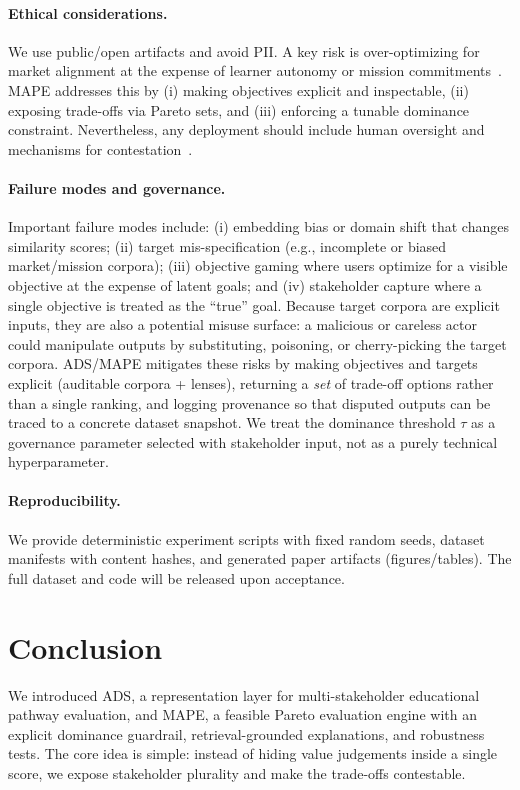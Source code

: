 \documentclass[sigconf,review]{acmart}
\newcommand{\ADS}{\textsc{ADS}\xspace}
\newcommand{\MAPE}{\textsc{MAPE}\xspace}
\begin{document}
\paragraph{Ethical considerations.}
We use public/open artifacts and avoid PII. A key risk is over-optimizing for market alignment at the expense of learner autonomy or mission commitments~\cite{ekstrand2019fairness}. \MAPE addresses this by (i) making objectives explicit and inspectable, (ii) exposing trade-offs via Pareto sets, and (iii) enforcing a tunable dominance constraint. Nevertheless, any deployment should include human oversight and mechanisms for contestation~\cite{alfrink2023contestable,dignum2025contesting}.

\paragraph{Failure modes and governance.}
Important failure modes include: (i) {embedding bias} or domain shift that changes similarity scores; (ii) {target mis-specification} (e.g., incomplete or biased market/mission corpora); (iii) {objective gaming} where users optimize for a visible objective at the expense of latent goals; and (iv) {stakeholder capture} where a single objective is treated as the ``true'' goal. Because target corpora are explicit inputs, they are also a potential misuse surface: a malicious or careless actor could manipulate outputs by substituting, poisoning, or cherry-picking the target corpora. \ADS/\MAPE mitigates these risks by making objectives and targets explicit (auditable corpora + lenses), returning a \emph{set} of trade-off options rather than a single ranking, and logging provenance so that disputed outputs can be traced to a concrete dataset snapshot. We treat the dominance threshold $\tau$ as a governance parameter selected with stakeholder input, not as a purely technical hyperparameter.

\paragraph{Reproducibility.}
We provide deterministic experiment scripts with fixed random seeds, dataset manifests with content hashes, and generated paper artifacts (figures/tables). The full dataset and code will be released upon acceptance.


\section{Conclusion}

We introduced \ADS, a representation layer for multi-stakeholder educational pathway evaluation, and \MAPE, a feasible Pareto evaluation engine with an explicit dominance guardrail, retrieval-grounded explanations, and robustness tests. The core idea is simple: instead of hiding value judgements inside a single score, we expose stakeholder plurality and make the trade-offs contestable.



\end{document}
